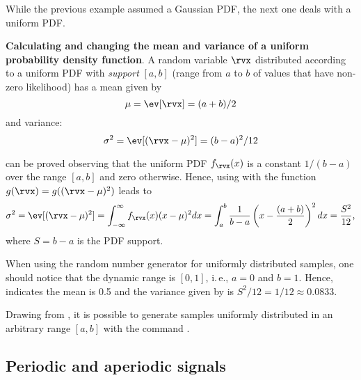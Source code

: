 While the previous example assumed a Gaussian PDF, the next one deals with a uniform PDF.

\bExample \textbf{Calculating and changing the mean and variance of a uniform probability density function}.
A random variable $\rvx$ distributed according to a uniform PDF with 
\emph{support} $[a, b]$ (range from $a$ to $b$ of values that have non-zero likelihood) has
a mean given by
\begin{equation}
\mu = \ev[\rvx] = (a+b)/2
\label{eq:uniform_mean}
\end{equation}
and variance:
\begin{equation}
\sigma^2 = \ev[(\rvx-\mu)^2] = (b-a)^2/12
\label{eq:uniform_variance}
\end{equation}

 can be proved observing that the uniform PDF $f_{\rvx}(x)$ is a constant $1/(b-a)$ over the range $[a,b]$ and zero otherwise. Hence, using  with the function $g(\rvx)=g((\rvx-\mu)^2)$ leads to
\begin{equation}
\sigma^2 = \ev[(\rvx-\mu)^2] = \int_{-\infty}^{\infty} f_{\rvx}(x) (x-\mu)^2 dx = \int_{a}^{b} \frac{1}{b-a}\left( x - \frac{(a+b)}{2} \right)^2 dx =\frac{S^2}{12},
\label{eq:variance_uniformrv}
\end{equation}
where $S=b-a$ is the PDF support.

When using the random number generator  for uniformly distributed samples, one should notice that the dynamic range is $[0, 1]$, i.\,e., $a=0$ and $b=1$. Hence,  indicates the mean is 0.5 and the variance given by  is
$S^2/12=1/12 \approx 0.0833$.

Drawing from , it is possible to generate  samples uniformly distributed in an arbitrary range $[a,b]$ with the command
.
\eExample



\subsection{Periodic and aperiodic signals}


